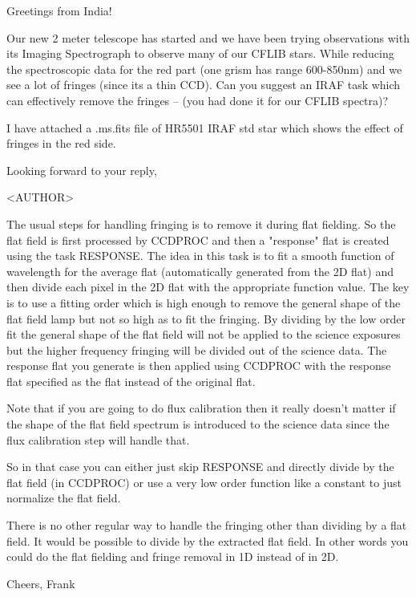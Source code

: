 Greetings from India! 

Our new 2 meter telescope has started and we have been trying
observations with its Imaging Spectrograph to observe many of our
CFLIB stars. While reducing the spectroscopic data for the red part
(one grism has range 600-850nm) and we see a lot of fringes (since its
a thin CCD). Can you suggest an IRAF task which can effectively remove
the fringes -- (you had done it for our CFLIB spectra)?

I have attached a .ms.fits file of HR5501 IRAF std star which shows
the effect of fringes in the red side.

Looking forward to your reply,

<AUTHOR>

The usual steps for handling fringing is to remove it during flat
fielding.  So the flat field is first processed by CCDPROC and then a
"response" flat is created using the task RESPONSE.  The idea in this
task is to fit a smooth function of wavelength for the average flat
(automatically generated from the 2D flat) and then divide each pixel
in the 2D flat with the appropriate function value.  The key is to use
a fitting order which is high enough to remove the general shape of
the flat field lamp but not so high as to fit the fringing.  By
dividing by the low order fit the general shape of the flat field will
not be applied to the science exposures but the higher frequency
fringing will be divided out of the science data.  The response flat
you generate is then applied using CCDPROC with the response flat
specified as the flat instead of the original flat.

Note that if you are going to do flux calibration then it really
doesn't matter if the shape of the flat field spectrum is introduced
to the science data since the flux calibration step will handle that.

So in that case you can either just skip RESPONSE and directly divide
by the flat field (in CCDPROC) or use a very low order function like a
constant to just normalize the flat field.

There is no other regular way to handle the fringing other than
dividing by a flat field.  It would be possible to divide by the
extracted flat field.  In other words you could do the flat fielding
and fringe removal in 1D instead of in 2D.

Cheers,
Frank
